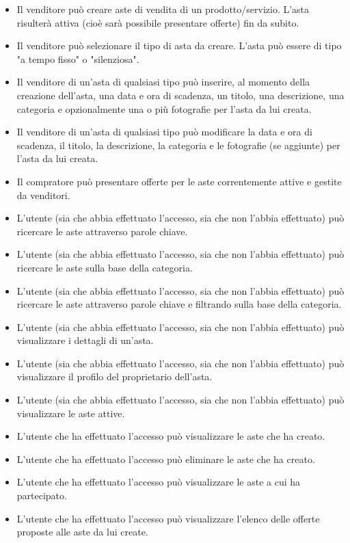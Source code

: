         \begin{itemize}
            \item Il venditore può creare aste di vendita di un prodotto/servizio. L'asta risulterà attiva (cioè sarà possibile presentare offerte) fin da subito.
            \item Il venditore può selezionare il tipo di asta da creare. L'asta può essere di tipo "a tempo fisso" o "silenziosa".
            \item Il venditore di un'asta di qualsiasi tipo può inserire, al momento della creazione dell'asta, una data e ora di scadenza, un titolo, una descrizione, una categoria e opzionalmente una o più fotografie per l'asta da lui creata.
            \item Il venditore di un'asta di qualsiasi tipo può modificare la data e ora di scadenza, il titolo, la descrizione, la categoria e le fotografie (se aggiunte) per l'asta da lui creata.
            \item Il compratore può presentare offerte per le aste correntemente attive e gestite da venditori.
        \end{itemize}
        \begin{itemize}
            \item L'utente (sia che abbia effettuato l'accesso, sia che non l'abbia effettuato) può ricercare le aste attraverso parole chiave.
            \item L'utente (sia che abbia effettuato l'accesso, sia che non l'abbia effettuato) può ricercare le aste sulla base della categoria.
            \item L'utente (sia che abbia effettuato l'accesso, sia che non l'abbia effettuato) può ricercare le aste attraverso parole chiave e filtrando sulla base della categoria.
            \item L'utente (sia che abbia effettuato l'accesso, sia che non l'abbia effettuato) può visualizzare i dettagli di un'asta.
            \item L'utente (sia che abbia effettuato l'accesso, sia che non l'abbia effettuato) può visualizzare il profilo del proprietario dell'asta.
            \item L'utente (sia che abbia effettuato l'accesso, sia che non l'abbia effettuato) può visualizzare le aste attive.
            \item L'utente che ha effettuato l'accesso può visualizzare le aste che ha creato.
            \item L'utente che ha effettuato l'accesso può eliminare le aste che ha creato.
            \item L'utente che ha effettuato l'accesso può visualizzare le aste a cui ha partecipato.
            \item L'utente che ha effettuato l'accesso può visualizzare l'elenco delle offerte proposte alle aste da lui create.
        \end{itemize}
